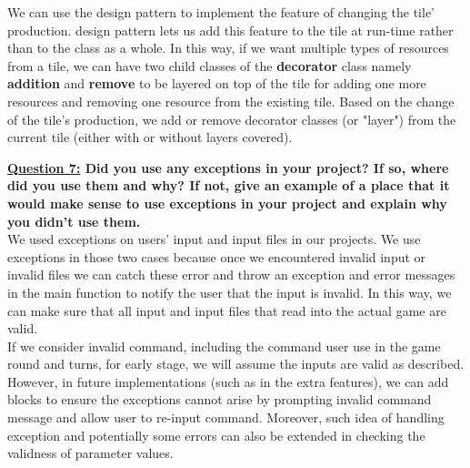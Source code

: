 \documentclass[11pt]{article}
\begin{document}
We can use the \Decorator design pattern to implement the feature of changing the tile' production. \Decorator design pattern lets us add this feature to the tile at run-time rather than to the class as a whole. In this way, if we want multiple types of resources from a tile, we can have two child classes of the \textbf{decorator} class namely \textbf{addition} and \textbf{remove} to be layered on top of the tile for adding one more resources and removing one resource from the existing tile. Based on the change of the tile's production, we add or remove decorator classes (or "layer") from the current tile (either with or without layers covered).

\textbf{\underline{Question 7:} Did you use any exceptions in your project? If so, where did you use them and why? If not, give an example of a place
that it would make sense to use exceptions in your project and explain why you didn’t use them.}\\

We used exceptions on users' input and input files in our projects. We use exceptions in those two cases because once we encountered invalid input or invalid files we can catch these error and throw an exception and error messages in the main function to notify the user that the input is invalid. In this way, we can make sure that all input and input files that read into the actual game are valid.\\

If we consider invalid command, including the command user use in the game round and turns, for early stage, we will assume the inputs are valid as described. However, in future implementations (such as in the extra features), we can add blocks to ensure the exceptions cannot arise by prompting invalid command message and allow user to re-input command. Moreover, such idea of handling exception and potentially some errors can also be extended in checking the validness of parameter values.

 
\end{document}

